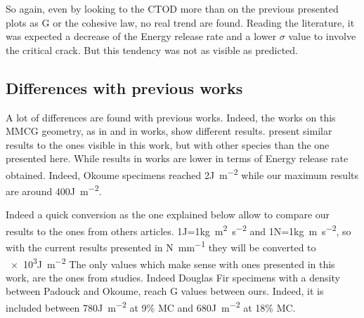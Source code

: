 So again, even by looking to the CTOD more than on the previous presented plots as G or the cohesive law, no real trend are found. Reading the literature, it was expected a decrease of the Energy release rate and a lower $\sigma$ value to involve the critical crack. But this tendency was not as visible as predicted.   


\subsection{Differences with previous works}

A lot of differences are found with previous works. Indeed, the works on this MMCG geometry, as in \parencite{Reference7} and in \parencite{Reference8} works, show different results. \parencite{Reference8} present similar results to the ones visible in this work, but with other species than the one presented here. While results in \parencite{Reference7} works are lower in terms of Energy release rate obtained. Indeed, Okoume specimens reached 2\si{\joule\per\square\meter} while our maximum results are around 400\si{\joule\per\square\meter}.

Indeed a quick conversion as the one explained below allow to compare our results to the ones from others articles.
1\si{\joule}=1\si{\kilo\gram\square\meter\per\square\second}
and 1\si{\newton}=1\si{\kilo\gram\meter\per\square\second}, so with the current results presented in  \si{\newton\per\milli\meter} they will be converted to \num{e3}\si{\joule\per\square\meter} 
The only values which make sense with ones presented in this work, are the ones from \parencite{Ang2017} studies. Indeed Douglas Fir specimens with a density between Padouck and Okoume, reach G values between ours. Indeed, it is included between 780\si{\joule\per\square\meter} at 9\% MC and 680\si{\joule\per\square\meter} at 18\% MC.

